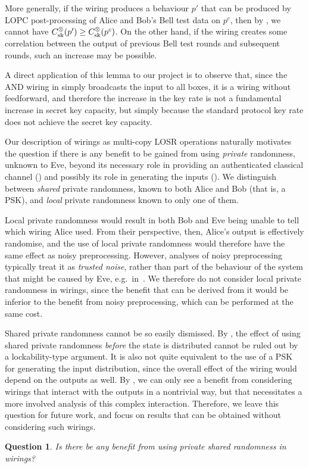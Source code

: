 \documentclass[10pt, a4paper]{article}
\numberwithin{equation}{section} %
\theoremstyle{definition}
\theoremstyle{plain}
\newtheorem{question}{Question}
\newcommand{\?}{\mathrel{?}} %
\newcommand{\sk}{\rm sk}
\begin{document}
    More generally, if the wiring produces a behaviour \(p'\) that can be produced by LOPC post-processing of Alice and Bob's Bell test data on \(p^c\), then by , we cannot have \(C_{\sk}^{\otimes}(p') \geq C_{\sk}^{\otimes}(p^c)\). On the other hand, if the wiring creates some correlation between the output of previous Bell test rounds and subsequent rounds, such an increase may be possible.

    A direct application of this lemma to our project is to observe that, since the AND wiring in  simply broadcasts the input to all boxes, it is a wiring without feedforward, and therefore the increase in the key rate is not a fundamental increase in secret key capacity, but simply because the standard protocol key rate does not achieve the secret key capacity.

    Our description of wirings as multi-copy LOSR operations naturally motivates the question if there is any benefit to be gained from using \emph{private} randomness, unknown to Eve, beyond its necessary role in providing an authenticated classical channel () and possibly its role in generating the inputs (). We distinguish between \emph{shared} private randomness, known to both Alice and Bob (that is, a PSK), and \emph{local} private randomness known to only one of them.

              Local private randomness would result in both Bob and Eve being unable to tell which wiring Alice used. From their perspective, then, Alice's output is effectively randomise, and the use of local private randomness would therefore have the same effect as noisy preprocessing. However, analyses of noisy preprocessing typically treat it as \emph{trusted noise}, rather than part of the behaviour of the system that might be caused by Eve, e.g.\ in~\cite{BFF_QRE, AsymmetricCHSH, DIQKD_FiniteSize}. We therefore do not consider local private randomness in wirings, since the benefit that can be derived from it would be inferior to the benefit from noisy preprocessing, which can be performed at the same cost.

              Shared private randomness cannot be so easily dismissed. By , the effect of using shared private randomness \emph{before} the state is distributed cannot be ruled out by a lockability-type argument. It is also not quite equivalent to the use of a PSK for generating the input distribution, since the overall effect of the wiring would depend on the outputs as well. By , we can only see a benefit from considering wirings that interact with the outputs in a nontrivial way, but that necessitates a more involved analysis of this complex interaction. Therefore, we leave this question for future work, and focus on results that can be obtained without considering such wirings.
              \begin{question}
                Is there be any benefit from using private shared randomness in wirings?
              \end{question}
\end{document}
